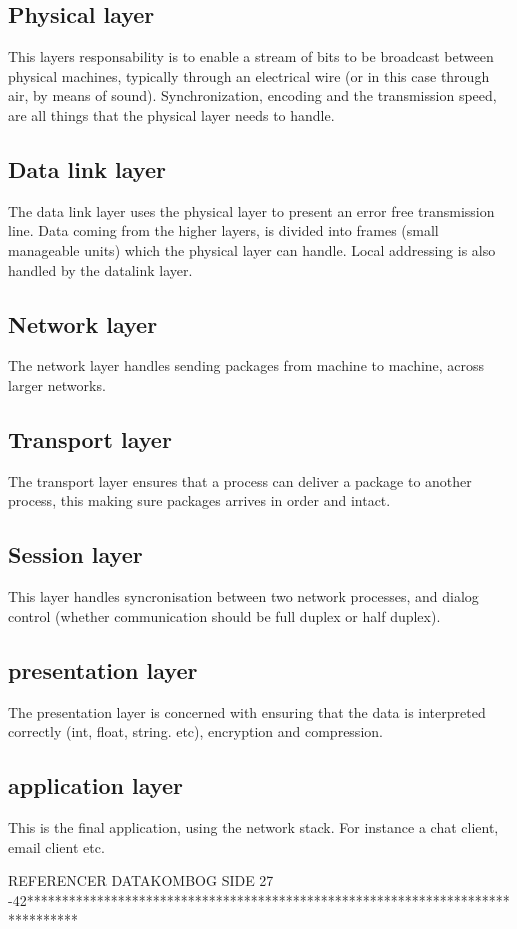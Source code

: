 \subsection{Physical layer}
This layers responsability is to enable a stream of bits to be broadcast between physical machines, typically through an electrical wire (or in this case through air, by means of sound). Synchronization, encoding and the transmission speed, are all things that the physical layer needs to handle.

\subsection{Data link layer}
The data link layer uses the physical layer to present an error free transmission line. Data coming from the higher layers, is divided into frames (small manageable units) which the physical layer can handle. Local addressing is also handled by the datalink layer.

\subsection{Network layer}
The network layer handles sending packages from machine to machine, across larger networks.

\subsection{Transport layer}
The transport layer ensures that a process can deliver a package to another process, this making sure packages arrives in order and intact.

\subsection{Session layer}
This layer handles syncronisation between two network processes, and dialog control (whether communication should be full duplex or half duplex).

\subsection{presentation layer}
The presentation layer is concerned with ensuring that the data is interpreted correctly (int, float, string. etc), encryption and compression.

\subsection{application layer}
This is the final application, using the network stack. For instance a chat client, email client etc.





REFERENCER DATAKOMBOG SIDE 27 -42*******************************************************************************